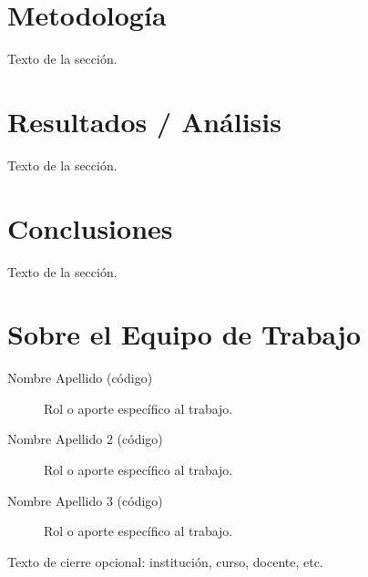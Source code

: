 \documentclass[fleqn, final]{jaes}
\begin{document}
\section{Metodología}\label{sec:metodologia}

Texto de la sección.

\section{Resultados / Análisis}\label{sec:resultados}

Texto de la sección.

\section{Conclusiones}\label{sec:conclusiones}

Texto de la sección.


\clearpage
{}
\section*{Sobre el Equipo de Trabajo}

\begin{description}
\item[Nombre Apellido (código)] Rol o aporte específico al trabajo.
\item[Nombre Apellido 2 (código)] Rol o aporte específico al trabajo.
\item[Nombre Apellido 3 (código)] Rol o aporte específico al trabajo.
\end{description}

\noindent Texto de cierre opcional: institución, curso, docente, etc.
\end{document}
